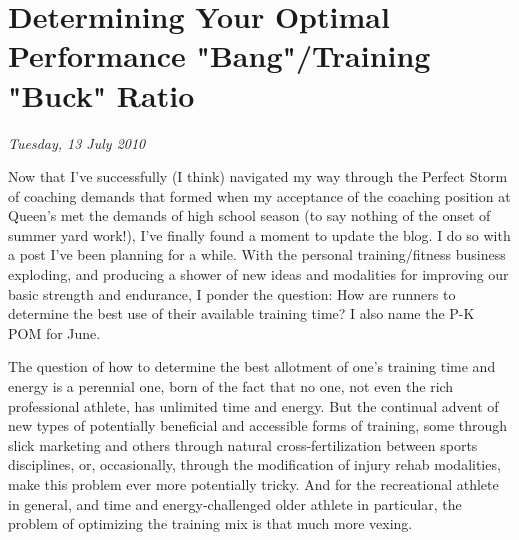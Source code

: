 \chapter{Determining Your Optimal Performance "Bang"/Training "Buck" Ratio}
\textit{Tuesday, 13 July 2010}
\bigskip

Now that I've successfully (I think) navigated my way through the Perfect Storm of coaching demands that formed when my acceptance of the coaching position at Queen's met the demands of high school season (to say nothing of the onset of summer yard work!), I've finally found a moment to update the blog. I do so with a post I've been planning for a while. With the personal training/fitness business exploding, and producing a shower of new ideas and modalities for improving our basic strength and endurance, I ponder the question: How are runners to determine the best use of their available training time? I also name the P-K POM for June.

The question of how to determine the best allotment of one's training time and energy is a perennial one, born of the fact that no one, not even the rich professional athlete, has unlimited time and energy. But the continual advent of new types of potentially beneficial and accessible forms of training, some through slick marketing and others through natural cross-fertilization between sports disciplines, or, occasionally, through the modification of injury rehab modalities, make this problem ever more potentially tricky. And for the recreational athlete in general, and time and energy-challenged older athlete in particular, the problem of optimizing the training mix is that much more vexing.

